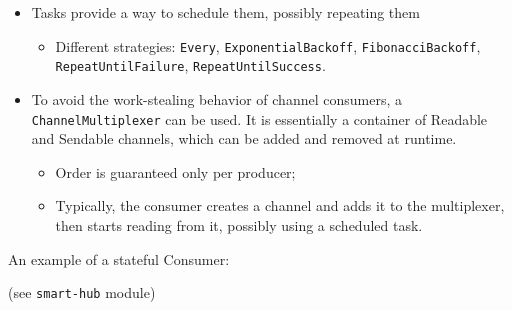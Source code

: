\documentclass[aspectratio=1610,xcolor=dvipsnames]{beamer}
\begin{document}
\begin{frame}
  \begin{itemize}
      \item Tasks provide a way to schedule them, possibly repeating them
      \begin{itemize}
          \item Different strategies: \texttt{Every}, \texttt{ExponentialBackoff}, \texttt{FibonacciBackoff}, \texttt{RepeatUntilFailure}, \texttt{RepeatUntilSuccess}.
      \end{itemize}
      \item To avoid the work-stealing behavior of channel consumers, a \texttt{ChannelMultiplexer} can be used. It is essentially a container of Readable and Sendable channels, which can be added and removed at runtime.
      \begin{itemize}
          \item Order is guaranteed only per producer;
          \item Typically, the consumer creates a channel and adds it to the multiplexer, then starts reading from it, possibly using a scheduled task.
      \end{itemize}
  \end{itemize}
\end{frame}


\begin{frame}
  
\end{frame}


\begin{frame}
  
\end{frame}


\begin{frame}
  An example of a stateful Consumer:
  
  \footnotesize
  (see \texttt{smart-hub} module)
\end{frame}


\begin{frame}
  
\end{frame}
\end{document}
